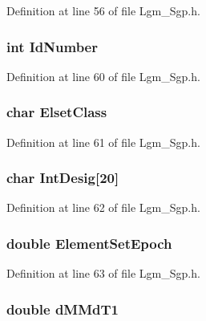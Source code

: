 Definition at line 56 of file Lgm\_\-Sgp.h.\hypertarget{struct___sgp_t_l_e_8134db9bcf3428082c18dba769258dfd}{
\subsubsection[{IdNumber}]{\setlength{\rightskip}{0pt plus 5cm}int {\bf IdNumber}}}
\label{struct___sgp_t_l_e_8134db9bcf3428082c18dba769258dfd}




Definition at line 60 of file Lgm\_\-Sgp.h.\hypertarget{struct___sgp_t_l_e_27655aa07b94161a7cad6c42562c2fd6}{
\subsubsection[{ElsetClass}]{\setlength{\rightskip}{0pt plus 5cm}char {\bf ElsetClass}}}
\label{struct___sgp_t_l_e_27655aa07b94161a7cad6c42562c2fd6}




Definition at line 61 of file Lgm\_\-Sgp.h.\hypertarget{struct___sgp_t_l_e_3a15ad7195fd3d6ea5481548706bf091}{
\subsubsection[{IntDesig}]{\setlength{\rightskip}{0pt plus 5cm}char {\bf IntDesig}\mbox{[}20\mbox{]}}}
\label{struct___sgp_t_l_e_3a15ad7195fd3d6ea5481548706bf091}




Definition at line 62 of file Lgm\_\-Sgp.h.\hypertarget{struct___sgp_t_l_e_9292d9013dff34d350a2dd9bf102eb6d}{
\subsubsection[{ElementSetEpoch}]{\setlength{\rightskip}{0pt plus 5cm}double {\bf ElementSetEpoch}}}
\label{struct___sgp_t_l_e_9292d9013dff34d350a2dd9bf102eb6d}




Definition at line 63 of file Lgm\_\-Sgp.h.\hypertarget{struct___sgp_t_l_e_0ffa4eb7b3b12cc2c8c51d6c300ca61a}{
\subsubsection[{dMMdT1}]{\setlength{\rightskip}{0pt plus 5cm}double {\bf dMMdT1}}}
\label{struct___sgp_t_l_e_0ffa4eb7b3b12cc2c8c51d6c300ca61a}




